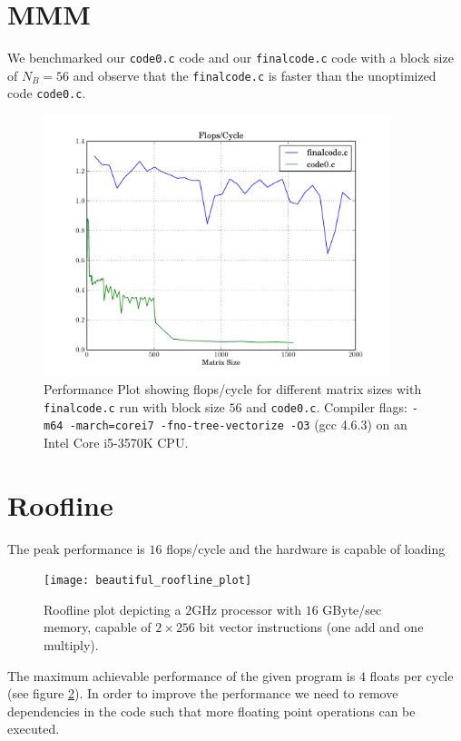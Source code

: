 \documentclass[portrait,a4paper]{article}
\begin{document}
\section{MMM}
We benchmarked our \lstinline{code0.c} code and our \lstinline{finalcode.c} code with a block size of $N_B=56$ and observe that the \lstinline{finalcode.c} is faster than the unoptimized code \lstinline{code0.c}.
\begin{figure}[H]
    \centering
    \includegraphics[width=0.9\textwidth]{code/flops_cycle_matrix}
    \caption{Performance Plot showing flops/cycle for different matrix sizes with \lstinline{finalcode.c} run with block size $56$ and \lstinline{code0.c}. Compiler flags: \texttt{-m64 -march=corei7 -fno-tree-vectorize -O3} (gcc 4.6.3) on an Intel Core i5-3570K CPU.}
    \label{fig:matrix_cycle}
\end{figure}  

\section{Roofline}
The peak performance is $16$ flops/cycle and the hardware is capable of loading 
\begin{figure}[H]
    \centering
    \texttt{[image: beautiful\_roofline\_plot]}
    \caption{Roofline plot depicting a $2$GHz processor with $16$ GByte/sec memory, capable of $2\times256$ bit vector instructions (one add and one multiply).}
    \label{fig:roofline}
\end{figure}
The maximum achievable performance of the given program is $4$ floats per cycle (see figure \ref{fig:roofline}). In order to improve the performance we need to remove dependencies in the code such that more floating point operations can be executed.
\end{document}
